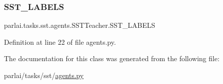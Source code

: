 \subsubsection{\texorpdfstring{S\+S\+T\+\_\+\+L\+A\+B\+E\+LS}{SST\_LABELS}}
{\footnotesize\ttfamily parlai.\+tasks.\+sst.\+agents.\+S\+S\+T\+Teacher.\+S\+S\+T\+\_\+\+L\+A\+B\+E\+LS}



Definition at line 22 of file agents.\+py.



The documentation for this class was generated from the following file\+:\begin{DoxyCompactItemize}
\item 
parlai/tasks/sst/\hyperlink{parlai_2tasks_2sst_2agents_8py}{agents.\+py}\end{DoxyCompactItemize}
